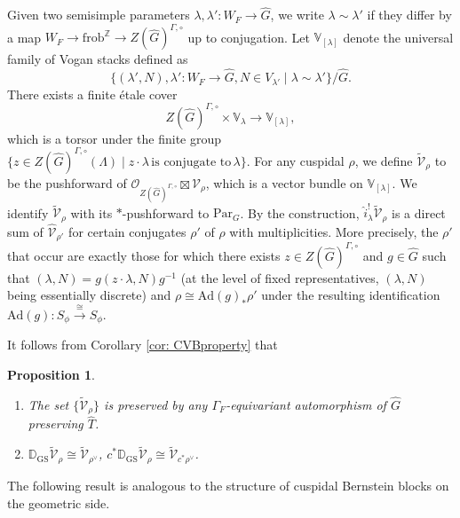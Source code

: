 \documentclass{amsart}
\newtheorem{proposition}[theorem]{Proposition}
\theoremstyle{definition}
\theoremstyle{remark}
\numberwithin{equation}{section}
\newcommand{\mc}{\mathcal}
\newcommand{\bb}{\mathbb}
\newcommand{\Z}{\mathbb{Z}}
\newcommand{\wh}{\widehat}
\newcommand{\D}{\mathbb{D}}
\newcommand{\frob}{\mathrm{frob}}
\newcommand{\Par}{\mathrm{Par}}
\newcommand{\Ad}{\mathrm{Ad}}
\newcommand{\GS}{\mathrm{GS}}
\newcommand{\V}{\mathbb{V}}
\begin{document}
Given two semisimple parameters $\lambda, \lambda'\colon W_F \to \wh G$, we write $\lambda \sim \lambda'$ if they differ by a map $W_F \to \frob^\Z \to Z(\widehat G)^{\Gamma, \circ}$ up to conjugation. Let $\bb{V}_{[\lambda]}$ denote the universal family of Vogan stacks defined as 
\[
\{ (\lambda', N), \lambda' \colon W_F\to \wh G, N\in V_{\lambda' } \mid \lambda \sim \lambda' \} /\wh G. 
\]
There exists a finite \'etale cover
\[
Z(\wh G)^{\Gamma, \circ}\times \V_\lambda\to \bb{V}_{[\lambda]}, 
\]
which is a torsor under the finite group $\{z \in Z(\wh G)^{\Gamma, \circ}(\Lambda) \mid z\cdot\lambda\,\text{is conjugate to}\,\lambda\}$. For any cuspidal $\rho$, we define $\widetilde{\mc V}_{\rho}$ to be the pushforward of $\mc O_{Z(\wh G)^{\Gamma, \circ}}\boxtimes \mc V_{\rho}$, which is a vector bundle on $\V_{[\lambda]}$. We identify $\widetilde{\mc V}_\rho$ with its $*$-pushforward to $\Par_G$. By the construction, $\wh{i}^!_\lambda \widetilde{\mc V}_\rho$ is a direct sum of $\wh{\mc V}_{\rho'}$ for certain conjugates $\rho'$ of $\rho$ with multiplicities. More precisely, the $\rho'$ that occur are exactly those for which there exists $z\in Z(\wh G)^{\Gamma, \circ}$ and $g\in \wh G$ such that $(\lambda, N)=g(z\cdot \lambda, N)g^{-1}$ (at the level of fixed representatives, $(\lambda, N)$ being essentially discrete) and $ \rho\cong \Ad(g)_*\rho'$ under the resulting identification $\Ad(g)\colon S_{\phi}\xrightarrow{\cong} S_\phi$. 

It follows from Corollary \ref{cor: CVBproperty} that

\begin{proposition}{\label{prop: cuspproperties}}
    \begin{enumerate}
    \item The set $\{\widetilde{\mc{V}}_{\rho}\}$ is preserved by any $\Gamma_F$-equivariant automorphism of $\wh G$ preserving $\wh T$. 
    \item $\D_\GS \widetilde{\mc V}_{\rho}\cong \widetilde{\mc V}_{\rho^{\vee}}$, $c^*\D_\GS\widetilde{\mc V}_{\rho}\cong \widetilde{\mc V}_{c^*\rho^{\vee}}$.      
    \end{enumerate}
\end{proposition}

The following result is analogous to the structure of cuspidal Bernstein blocks on the geometric side. 
\end{document}
